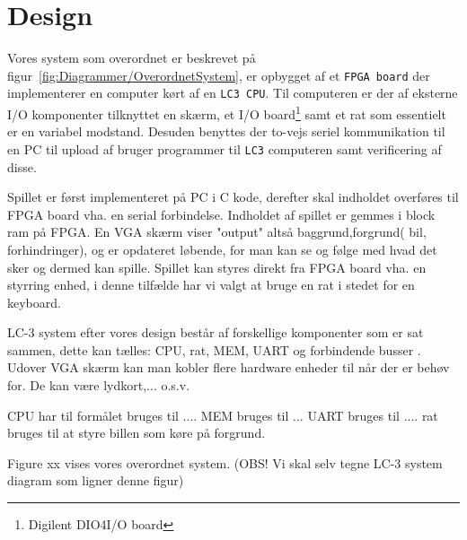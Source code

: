 \chapter{Design}\label{cha:design}
Vores system som overordnet er beskrevet på figur~\vref{fig:Diagrammer/OverordnetSystem}, er opbygget af et \texttt{FPGA board} der implementerer en computer kørt af en \texttt{LC3 CPU}. Til computeren er der af eksterne I/O komponenter tilknyttet en skærm, et I/O board\footnote{Digilent DIO4\texttrademark I/O board} samt et rat som essentielt er en variabel modstand. Desuden benyttes der to-vejs seriel kommunikation til en PC til upload af bruger programmer til \texttt{LC3} computeren samt verificering af disse.


Spillet er først implementeret på PC i C kode, derefter skal indholdet overføres til FPGA board vha. en serial forbindelse. Indholdet af spillet er gemmes i block ram på FPGA. En VGA skærm viser "output" altså baggrund,forgrund( bil, forhindringer), og er opdateret løbende, for man kan se og følge med hvad det sker og dermed kan spille. Spillet kan styres direkt fra FPGA board vha. en styrring enhed, i denne tilfælde har vi valgt at bruge en rat i stedet for en keyboard.

LC-3 system efter vores design består af forskellige komponenter som er sat sammen, dette kan tælles: CPU, rat, MEM, UART og  forbindende busser . Udover VGA skærm kan man kobler flere hardware enheder til når der er behøv for. De kan være lydkort,... o.s.v.

CPU har til formålet bruges til ....
MEM bruges til ...
UART bruges til ....
rat bruges til at styre billen som køre på forgrund.

Figure xx vises vores overordnet system.
(OBS! Vi skal selv tegne LC-3 system diagram som ligner denne figur)